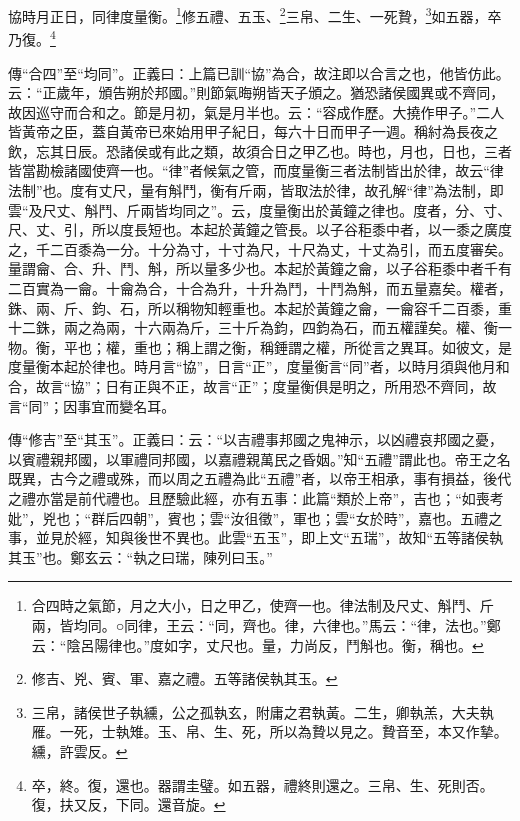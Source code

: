 協時月正日，同律度量衡。\footnote{合四時之氣節，月之大小，日之甲乙，使齊一也。律法制及尺丈、斛鬥、斤兩，皆均同。○同律，王云：“同，齊也。律，六律也。”馬云：“律，法也。”鄭云：“陰呂陽律也。”度如字，丈尺也。量，力尚反，鬥斛也。衡，稱也。}修五禮、五玉、\footnote{修吉、兇、賓、軍、嘉之禮。五等諸侯執其玉。}三帛、二生、一死贄，\footnote{三帛，諸侯世子執纁，公之孤執玄，附庸之君執黃。二生，卿執羔，大夫執雁。一死，士執雉。玉、帛、生、死，所以為贄以見之。贄音至，本又作摯。纁，許雲反。}如五器，卒乃復。\footnote{卒，終。復，還也。器謂圭璧。如五器，禮終則還之。三帛、生、死則否。復，扶又反，下同。還音旋。}

{\noindent\zhuan{}\fzbyks 傳“合四”至“均同”。正義曰：上篇已訓“協”為合，故注即以合言之也，他皆仿此。云：“正歲年，頒告朔於邦國。”則節氣晦朔皆天子頒之。猶恐諸侯國異或不齊同，故因巡守而合和之。節是月初，氣是月半也。云：“容成作歷。大撓作甲子。”二人皆黃帝之臣，蓋自黃帝已來始用甲子紀日，每六十日而甲子一週。稱紂為長夜之飲，忘其日辰。恐諸侯或有此之類，故須合日之甲乙也。時也，月也，日也，三者皆當勘檢諸國使齊一也。“律”者候氣之管，而度量衡三者法制皆出於律，故云“律法制”也。度有丈尺，量有斛鬥，衡有斤兩，皆取法於律，故孔解“律”為法制，即雲“及尺丈、斛鬥、斤兩皆均同之”。云，度量衡出於黃鐘之律也。度者，分、寸、尺、丈、引，所以度長短也。本起於黃鐘之管長。以子谷秬黍中者，以一黍之廣度之，千二百黍為一分。十分為寸，十寸為尺，十尺為丈，十丈為引，而五度審矣。量謂龠、合、升、鬥、斛，所以量多少也。本起於黃鐘之龠，以子谷秬黍中者千有二百實為一龠。十龠為合，十合為升，十升為鬥，十鬥為斛，而五量嘉矣。權者，銖、兩、斤、鈞、石，所以稱物知輕重也。本起於黃鐘之龠，一龠容千二百黍，重十二銖，兩之為兩，十六兩為斤，三十斤為鈞，四鈞為石，而五權謹矣。權、衡一物。衡，平也；權，重也；稱上謂之衡，稱錘謂之權，所從言之異耳。如彼文，是度量衡本起於律也。時月言“協”，日言“正”，度量衡言“同”者，以時月須與他月和合，故言“協”；日有正與不正，故言“正”；度量衡俱是明之，所用恐不齊同，故言“同”；因事宜而變名耳。 \par}

{\noindent\zhuan{}\fzbyks 傳“修吉”至“其玉”。正義曰：云：“以吉禮事邦國之鬼神示，以凶禮哀邦國之憂，以賓禮親邦國，以軍禮同邦國，以嘉禮親萬民之昏姻。”知“五禮”謂此也。帝王之名既異，古今之禮或殊，而以周之五禮為此“五禮”者，以帝王相承，事有損益，後代之禮亦當是前代禮也。且歷驗此經，亦有五事：此篇“類於上帝”，吉也；“如喪考妣”，兇也；“群后四朝”，賓也；雲“汝徂徵”，軍也；雲“女於時”，嘉也。五禮之事，並見於經，知與後世不異也。此雲“五玉”，即上文“五瑞”，故知“五等諸侯執其玉”也。鄭玄云：“執之曰瑞，陳列曰玉。” \par}

